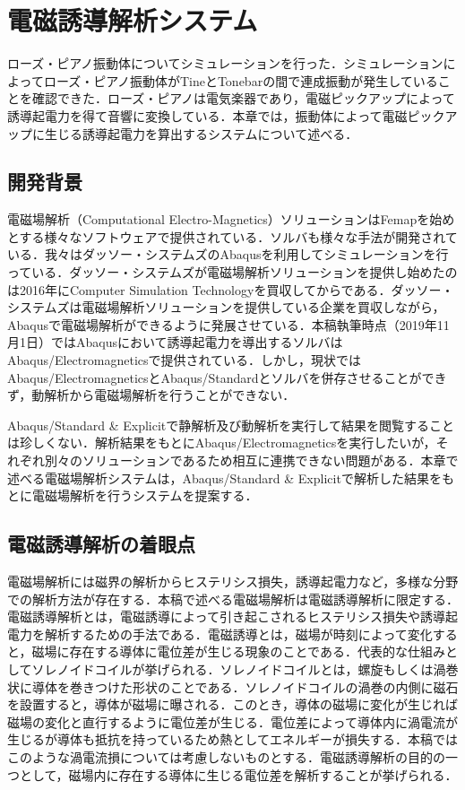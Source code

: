 \section{電磁誘導解析システム}

ローズ・ピアノ振動体についてシミュレーションを行った．シミュレーションによってローズ・ピアノ振動体がTineとTonebarの間で連成振動が発生していることを確認できた．ローズ・ピアノは電気楽器であり，電磁ピックアップによって誘導起電力を得て音響に変換している．本章では，振動体によって電磁ピックアップに生じる誘導起電力を算出するシステムについて述べる．

\subsection{開発背景}

電磁場解析（Computational Electro-Magnetics）ソリューションはFemapを始めとする様々なソフトウェアで提供されている．ソルバも様々な手法が開発されている．我々はダッソー・システムズのAbaqusを利用してシミュレーションを行っている．ダッソー・システムズが電磁場解析ソリューションを提供し始めたのは2016年にComputer Simulation Technologyを買収してからである．ダッソー・システムズは電磁場解析ソリューションを提供している企業を買収しながら，Abaqusで電磁場解析ができるように発展させている．本稿執筆時点（2019年11月1日）ではAbaqusにおいて誘導起電力を導出するソルバはAbaqus/Electromagneticsで提供されている．しかし，現状ではAbaqus/ElectromagneticsとAbaqus/Standardとソルバを併存させることができず，動解析から電磁場解析を行うことができない．

Abaqus/Standard & Explicitで静解析及び動解析を実行して結果を閲覧することは珍しくない．解析結果をもとにAbaqus/Electromagneticsを実行したいが，それぞれ別々のソリューションであるため相互に連携できない問題がある．本章で述べる電磁場解析システムは，Abaqus/Standard & Explicitで解析した結果をもとに電磁場解析を行うシステムを提案する．

\subsection{電磁誘導解析の着眼点}

電磁場解析には磁界の解析からヒステリシス損失，誘導起電力など，多様な分野での解析方法が存在する．本稿で述べる電磁場解析は電磁誘導解析に限定する．電磁誘導解析とは，電磁誘導によって引き起こされるヒステリシス損失や誘導起電力を解析するための手法である．電磁誘導とは，磁場が時刻によって変化すると，磁場に存在する導体に電位差が生じる現象のことである．代表的な仕組みとしてソレノイドコイルが挙げられる．ソレノイドコイルとは，螺旋もしくは渦巻状に導体を巻きつけた形状のことである．ソレノイドコイルの渦巻の内側に磁石を設置すると，導体が磁場に曝される．このとき，導体の磁場に変化が生じれば磁場の変化と直行するように電位差が生じる．電位差によって導体内に渦電流が生じるが導体も抵抗を持っているため熱としてエネルギーが損失する．本稿ではこのような渦電流損については考慮しないものとする．電磁誘導解析の目的の一つとして，磁場内に存在する導体に生じる電位差を解析することが挙げられる．

